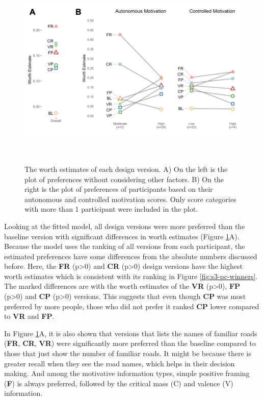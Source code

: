 \begin{figure}[h]
\centering
  \includegraphics[scale=.9]{figures/s3-worth-overall-motivation.png}
  \caption{The worth estimates of each design version. A) On the left is the plot of preferences without considering other factors. B) On the right is the plot of preferences of participants based on their autonomous and controlled motivation scores. Only score categories with more than 1 participant were included in the plot.}~\label{fig:s3-worth-overall-motivation}
\end{figure}

Looking at the fitted model, all design versions were more preferred than the baseline version with significant differences in worth estimates (Figure \ref{fig:s3-worth-overall-motivation}A). Because the model uses the ranking of all versions from each participant, the estimated preferences have some differences from the absolute numbers discussed before. Here, the \textbf{FR} (p>0) and \textbf{CR} (p>0) design versions have the highest worth estimates which is consistent with its ranking in Figure \ref{fig:s3-pc-winners}. The marked differences are with the worth estimates of the \textbf{VR} (p>0), \textbf{FP} (p>0) and \textbf{CP} (p>0) versions. This suggests that even though \textbf{CP} was most preferred by more people, those who did not prefer it ranked \textbf{CP} lower compared to \textbf{VR} and \textbf{FP}. 

In Figure \ref{fig:s3-worth-overall-motivation}A, it is also shown that versions that lists the names of familiar roads (\textbf{FR}, \textbf{CR}, \textbf{VR}) were significantly more preferred than the baseline compared to those that just show the number of familiar roads. It might be because there is greater recall when they see the road names, which helps in their decision making. And among the motivative information types, simple positive framing (\textbf{F}) is always preferred, followed by the critical mass (C) and valence (V) information.


